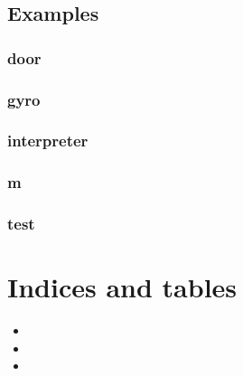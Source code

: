 \documentclass[letterpaper,10pt,english]{sphinxmanual}
\begin{document}
\section{Examples}
\label{\detokenize{x_examples:examples}}\label{\detokenize{x_examples::doc}}

\subsection{door}
\label{\detokenize{x_examples:door}}

\subsection{gyro}
\label{\detokenize{x_examples:gyro}}

\subsection{interpreter}
\label{\detokenize{x_examples:interpreter}}

\subsection{m}
\label{\detokenize{x_examples:m}}

\subsection{test}
\label{\detokenize{x_examples:test}}

\chapter{Indices and tables}
\label{\detokenize{index:indices-and-tables}}\begin{itemize}
\item {} 

\item {} 

\item {} 

\end{itemize}
\end{document}
